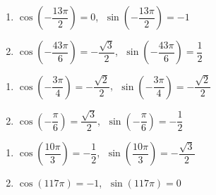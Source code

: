 \begin{multicols}{2}

\begin{enumerate}

\setcounter{enumi}{\value{HW}}

\item $\cos \left(-\dfrac{13\pi}{2}\right) = 0$, $\; \sin \left(-\dfrac{13\pi}{2}\right) = -1$ 

\item $\cos\left(-\dfrac{43\pi}{6}\right) = -\dfrac{\sqrt{3}}{2}$, $\; \sin\left(-\dfrac{43\pi}{6}\right) = \dfrac{1}{2}$

\setcounter{HW}{\value{enumi}}

\end{enumerate}

\end{multicols}

\begin{multicols}{2}

\begin{enumerate}

\setcounter{enumi}{\value{HW}}

\item $\cos \left(-\dfrac{3\pi}{4} \right) = -\dfrac{\sqrt{2}}{2}$, $\; \sin \left(-\dfrac{3\pi}{4} \right) = -\dfrac{\sqrt{2}}{2}$

\item $\cos\left(-\dfrac{\pi}{6}\right) = \dfrac{\sqrt{3}}{2}$, $\; \sin\left(-\dfrac{\pi}{6}\right) = -\dfrac{1}{2}$

\setcounter{HW}{\value{enumi}}

\end{enumerate}

\end{multicols}

\begin{multicols}{2}

\begin{enumerate}

\setcounter{enumi}{\value{HW}}

\item $\cos\left(\dfrac{10\pi}{3}\right) = -\dfrac{1}{2}$, $\; \sin \left(\dfrac{10\pi}{3}\right) = -\dfrac{\sqrt{3}}{2}$

\item $\cos(117\pi) = -1$, $\; \sin(117\pi) = 0$ 

\setcounter{HW}{\value{enumi}}

\end{enumerate}

\end{multicols}

